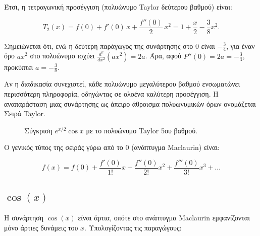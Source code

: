 \documentclass[a4paper, 11pt]{article}
\begin{document}
Έτσι, η τετραγωνική προσέγγιση (πολυώνυμο Taylor δεύτερου βαθμού) είναι:

\[
\boxed{T_2(x) = f(0) + f'(0)\,x + \frac{f''(0)}{2}\,x^2 = 1 + \frac{x}{2} - \frac{3}{8}x^2}.
\]

Σημειώνεται ότι, ενώ η δεύτερη παράγωγος της συνάρτησης στο \(0\) είναι
\(-\frac{3}{4}\), για έναν όρο \(a x^2\) στο πολυώνυμο ισχύει
\(\frac{d^2}{dx^2}(a x^2)=2a\). Άρα, αφού \(P''(0)=2a=-\frac{3}{4}\),
προκύπτει \(a=-\frac{3}{8}\).

Αν η διαδικασία συνεχιστεί, κάθε πολυώνυμο μεγαλύτερου βαθμού
ενσωματώνει περισσότερη πληροφορία, οδηγώντας σε ολοένα καλύτερη
προσέγγιση. Η αναπαράσταση μιας συνάρτησης ως άπειρο άθροισμα
πολυωνυμικών όρων ονομάζεται Σειρά Taylor.

\begin{figure}[htbp]
\centering
{}
\caption{Σύγκριση $e^{x/2}\cos x$ με το πολυώνυμο Taylor 5ου βαθμού.}
\label{fig:expcostaylor}
\end{figure}

Ο γενικός τύπος της σειράς γύρω από το \(0\) (ανάπτυγμα Maclaurin)
είναι:

\[f(x) = f(0) + \frac{f'(0)}{1!}x + \frac{f''(0)}{2!}x^2 + \frac{f'''(0)}{3!}x^3 + \dots\]

\subsection{\texorpdfstring{\(\cos(x)\)}{\textbackslash cos(x)}}\label{cosx}

Η συνάρτηση \(\cos(x)\) είναι άρτια, οπότε στο ανάπτυγμα Maclaurin
εμφανίζονται μόνο άρτιες δυνάμεις του \(x\). Υπολογίζοντας τις
παραγώγους:
\end{document}
